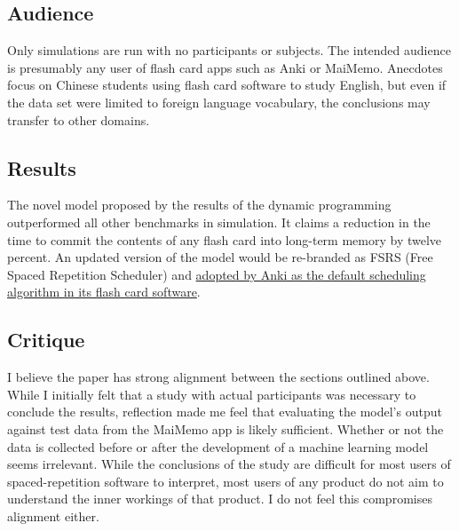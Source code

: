 \documentclass[
	letterpaper, %
]{jdf}
\begin{document}
\subsection{Audience}
Only simulations are run with no participants or subjects. The intended audience is presumably any user of flash card apps such as Anki or MaiMemo. Anecdotes focus on Chinese students using flash card software to study English, but even if the data set were limited to foreign language vocabulary, the conclusions may transfer to other domains.

\subsection{Results}
The novel model proposed by the results of the dynamic programming outperformed all other benchmarks in simulation. It claims a reduction in the time to commit the contents of any flash card into long-term memory by twelve percent. An updated version of the model would be re-branded as FSRS (Free Spaced Repetition Scheduler) and \href{https://www.reddit.com/r/Anki/comments/1c29775/fsrs_is_one_of_the_most_accurate_spaced/?share_id=d13fqqdzSlqgHFhq0kJ7M&utm_content=1&utm_medium=android_app&utm_name=androidcss&utm_source=share&utm_term=1}{adopted by Anki as the default scheduling algorithm in its flash card software}.

\subsection{Critique}
I believe the paper has strong alignment between the sections outlined above. While I initially felt that a study with actual participants was necessary to conclude the results, reflection made me feel that evaluating the model's output against test data from the MaiMemo app is likely sufficient. Whether or not the data is collected before or after the development of a machine learning model seems irrelevant. While the conclusions of the study are difficult for most users of spaced-repetition software to interpret, most users of any product do not aim to understand the inner workings of that product. I do not feel this compromises alignment either.

\printbibliography{}
\end{document}
